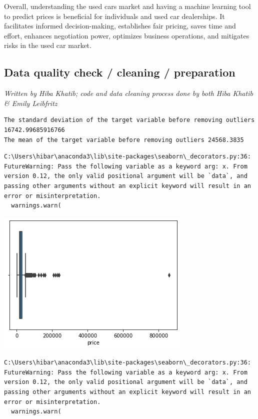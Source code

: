 \documentclass[
  letterpaper,
  DIV=11,
  numbers=noendperiod]{scrartcl}
\begin{document}
Overall, understanding the used cars market and having a machine
learning tool to predict prices is beneficial for individuals and used
car dealerships. It facilitates informed decision-making, establishes
fair pricing, saves time and effort, enhances negotiation power,
optimizes business operations, and mitigates risks in the used car
market.

\hypertarget{data-quality-check-cleaning-preparation}{%
\subsection{Data quality check / cleaning /
preparation}\label{data-quality-check-cleaning-preparation}}

\emph{Written by Hiba Khatib; code and data cleaning process done by
both Hiba Khatib \& Emily Leibfritz}

\begin{verbatim}
The standard deviation of the target variable before removing outliers 16742.99685916766
The mean of the target variable before removing outliers 24568.3835
\end{verbatim}

\begin{verbatim}
C:\Users\hibar\anaconda3\lib\site-packages\seaborn\_decorators.py:36: FutureWarning: Pass the following variable as a keyword arg: x. From version 0.12, the only valid positional argument will be `data`, and passing other arguments without an explicit keyword will result in an error or misinterpretation.
  warnings.warn(
\end{verbatim}

\includegraphics{Final Project Report - Used Cars Regression_files/figure-pdf/cell-3-output-3.png}

\begin{verbatim}
C:\Users\hibar\anaconda3\lib\site-packages\seaborn\_decorators.py:36: FutureWarning: Pass the following variable as a keyword arg: x. From version 0.12, the only valid positional argument will be `data`, and passing other arguments without an explicit keyword will result in an error or misinterpretation.
  warnings.warn(
\end{verbatim}
\end{document}
